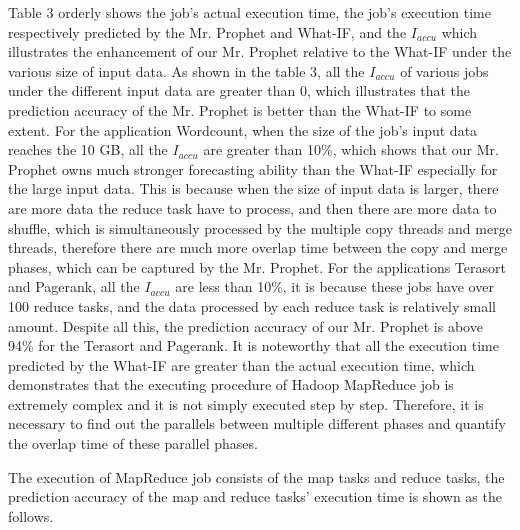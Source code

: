 Table 3 orderly shows the job's actual execution time, the job's execution time respectively predicted by the Mr. Prophet and What-IF, and the $I_{accu}$ which illustrates the enhancement of our Mr. Prophet relative to the What-IF under the various size of input data. As shown in the table 3, all the $I_{accu}$ of various jobs under the different input data  are greater than 0, which illustrates that the prediction accuracy of the Mr. Prophet is better than the What-IF to some extent. For the application Wordcount, when the size of the job's input data reaches the 10 GB, all the $I_{accu}$ are greater than 10\%, which shows that our Mr. Prophet owns much stronger forecasting ability than the What-IF especially for the large input data. This is because when the size of input data is larger, there are more data the reduce task have to process, and then there are more data to shuffle, which is simultaneously processed by the multiple copy threads and merge threads, therefore there are much more overlap time between the copy and merge phases, which can be captured by the Mr. Prophet. For the applications Terasort and Pagerank, all the $I_{accu}$ are less than 10\%, it is because these jobs have over 100 reduce tasks, and the data processed by each reduce task is relatively small amount. Despite all this, the prediction accuracy of our Mr. Prophet is above 94\% for the Terasort and Pagerank. It is noteworthy that all the execution time predicted by the What-IF are greater than the actual execution time, which demonstrates that the executing procedure of Hadoop MapReduce job is extremely complex and it is not simply executed step by step. Therefore, it is necessary to find out the parallels between multiple different phases and quantify the overlap time of these parallel phases.

The execution of MapReduce job consists of the map tasks and reduce tasks, the prediction accuracy of the map and reduce tasks' execution time is shown as the follows.

